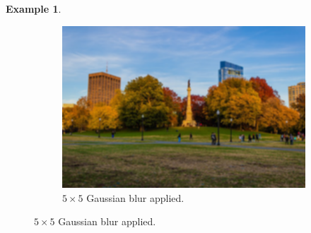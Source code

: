 \documentclass{article}
\theoremstyle{definition}
\newtheorem{example}{Example}[section]
\theoremstyle{remark}
\theoremstyle{definition}
\begin{document}
\begin{example}
\begin{figure}[hbt!]
        \begin{subfigure}[b]{0.32\textwidth}
        \centering
            \includegraphics[width=\textwidth]{Images/OpenCV/Gaussian_Blur.png}
            \caption{$5 \times 5$ Gaussian blur applied. }
            \label{fig:normal_blur_image}
        \end{subfigure}
        

\end{figure}
\end{example}
\end{document}
